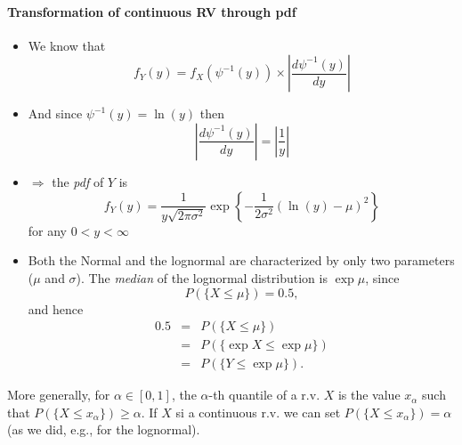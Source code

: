 \documentclass[notes=show,smaller,handout]{beamer}\usepackage[]{graphicx}\usepackage[]{color}
\renewcommand{\Pr}{P}
\newenvironment{stepitemize}{\begin{itemize}[<+->]}{\end{itemize} }
\begin{document}
\begin{frame}{\secname}
  \framesubtitle{Transformation of continuous RV through pdf }
  \begin{example}[continued]
  \begin{stepitemize}
  \item We know that
  \begin{equation*}
  f_{Y}\left( y\right) =f_{X}\left( \psi ^{-1}\left( y\right) \right) \times
  \left\vert \frac{d\psi ^{-1}\left( y\right) }{dy}\right\vert
  \end{equation*}

  \item And since $\psi ^{-1}\left( y\right) =\ln (y)$ then
  \begin{equation*}
  \left\vert \frac{d\psi ^{-1}\left( y\right) }{dy}\right\vert =\left\vert
  \frac{1}{y}\right\vert
  \end{equation*}

  \item $\Rightarrow $ the \emph{pdf} of $Y$ is
  \begin{equation*}
  f_{Y}\left( y\right) =\frac{1}{y\sqrt{2\pi \sigma ^{2}}}\exp{ \left\{ -\frac{1%
  }{2\sigma ^{2}}\left( \ln (y)-\mu \right) ^{2}\right\}}
  \end{equation*}
  for any $0<y<\infty $
  \end{stepitemize}
  \end{example}
\end{frame}

\begin{frame}{\secname}
  \begin{example}[continued]
  \begin{stepitemize}
  \item Both the Normal and the lognormal are characterized by
  only two parameters ($\mu$ and $\sigma$). The \emph{median} of the lognormal distribution is $\exp{
  \mu } $, since $$
  \Pr \left( \{ X\leq \mu \} \right) = 0.5,
  $$
  and hence%
  \begin{eqnarray*}
  0.5 &=&\Pr \left(\{ X\leq \mu \}\right) \\
  &=&\Pr \left( \{\exp{X} \leq \exp{ \mu }\} \right) \\
  &=&\Pr \left( \{Y\leq \exp{ \mu }\} \right).
  \end{eqnarray*}
  \end{stepitemize}
  \end{example}
  More generally, for $\alpha\in[0,1]$, the $\alpha$-th quantile of a r.v. $X$ is the value $x_\alpha$ such that $P(\{X \leq x_\alpha\})\geq\alpha$. If $X$ si a continuous r.v.  we can set $P(\{X \leq x_\alpha\})=\alpha$ (as we did, e.g., for the lognormal).
\end{frame}
\end{document}
